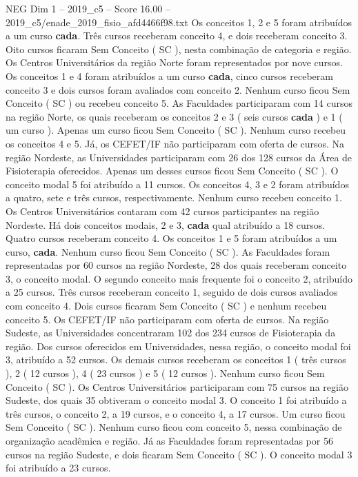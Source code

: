 \begin{textsample}{NEG Dim 1 – 2019\_c5 – Score 16.00 – 2019\_c5/enade\_2019\_fisio\_afd4466f98.txt}
Os conceitos 1, 2 e 5 foram atribuídos a um curso \textbf{cada}.
Três cursos receberam conceito 4, e dois receberam conceito 3.
Oito cursos ficaram Sem Conceito ( SC ), nesta combinação de categoria e região.
Os Centros Universitários da região Norte foram representados por nove cursos.
Os conceitos 1 e 4 foram atribuídos a um curso \textbf{cada}, cinco cursos receberam conceito 3 e dois cursos foram avaliados com conceito 2.
Nenhum curso ficou Sem Conceito ( SC ) ou recebeu conceito 5.
As Faculdades participaram com 14 cursos na região Norte, os quais receberam os conceitos 2 e 3 ( seis cursos \textbf{cada} ) e 1 ( um curso ).
Apenas um curso ficou Sem Conceito ( SC ).
Nenhum curso recebeu os conceitos 4 e 5.
Já, os CEFET/IF não participaram com oferta de cursos.
Na região Nordeste, as Universidades participaram com 26 dos 128 cursos da Área de Fisioterapia oferecidos.
Apenas um desses cursos ficou Sem Conceito ( SC ).
O conceito modal 5 foi atribuído a 11 cursos.
Os conceitos 4, 3 e 2 foram atribuídos a quatro, sete e três cursos, respectivamente.
Nenhum curso recebeu conceito 1.
Os Centros Universitários contaram com 42 cursos participantes na região Nordeste.
Há dois conceitos modais, 2 e 3, \textbf{cada} qual atribuído a 18 cursos.
Quatro cursos receberam conceito 4.
Os conceitos 1 e 5 foram atribuídos a um curso, \textbf{cada}.
Nenhum curso ficou Sem Conceito ( SC ).
As Faculdades foram representadas por 60 cursos na região Nordeste, 28 dos quais receberam conceito 3, o conceito modal.
O segundo conceito mais frequente foi o conceito 2, atribuído a 25 cursos.
Três cursos receberam conceito 1, seguido de dois cursos avaliados com conceito 4.
Dois cursos ficaram Sem Conceito ( SC ) e nenhum recebeu conceito 5.
Os CEFET/IF não participaram com oferta de cursos.
Na região Sudeste, as Universidades concentraram 102 dos 234 cursos de Fisioterapia da região.
Dos cursos oferecidos em Universidades, nessa região, o conceito modal foi 3, atribuído a 52 cursos.
Os demais cursos receberam os conceitos 1 ( três cursos ), 2 ( 12 cursos ), 4 ( 23 cursos ) e 5 ( 12 cursos ).
Nenhum curso ficou Sem Conceito ( SC ).
Os Centros Universitários participaram com 75 cursos na região Sudeste, dos quais 35 obtiveram o conceito modal 3.
O conceito 1 foi atribuído a três cursos, o conceito 2, a 19 cursos, e o conceito 4, a 17 cursos.
Um curso ficou Sem Conceito ( SC ).
Nenhum curso ficou com conceito 5, nessa combinação de organização acadêmica e região.
Já as Faculdades foram representadas por 56 cursos na região Sudeste, e dois ficaram Sem Conceito ( SC ).
O conceito modal 3 foi atribuído a 23 cursos.

\end{textsample}

